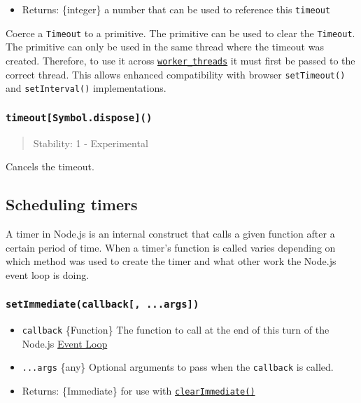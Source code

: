 \begin{itemize}
\tightlist
\item
  Returns: \{integer\} a number that can be used to reference this
  \texttt{timeout}
\end{itemize}

Coerce a \texttt{Timeout} to a primitive. The primitive can be used to
clear the \texttt{Timeout}. The primitive can only be used in the same
thread where the timeout was created. Therefore, to use it across
\href{worker_threads.md}{\texttt{worker\_threads}} it must first be
passed to the correct thread. This allows enhanced compatibility with
browser \texttt{setTimeout()} and \texttt{setInterval()}
implementations.

\subsubsection{\texorpdfstring{\texttt{timeout{[}Symbol.dispose{]}()}}{timeout{[}Symbol.dispose{]}()}}\label{timeoutsymbol.dispose}

\begin{quote}
Stability: 1 - Experimental
\end{quote}

Cancels the timeout.

\subsection{Scheduling timers}\label{scheduling-timers}

A timer in Node.js is an internal construct that calls a given function
after a certain period of time. When a timer's function is called varies
depending on which method was used to create the timer and what other
work the Node.js event loop is doing.

\subsubsection{\texorpdfstring{\texttt{setImmediate(callback{[},\ ...args{]})}}{setImmediate(callback{[}, ...args{]})}}\label{setimmediatecallback-...args}

\begin{itemize}
\tightlist
\item
  \texttt{callback} \{Function\} The function to call at the end of this
  turn of the Node.js
  \href{https://nodejs.org/en/docs/guides/event-loop-timers-and-nexttick/\#setimmediate-vs-settimeout}{Event
  Loop}
\item
  \texttt{...args} \{any\} Optional arguments to pass when the
  \texttt{callback} is called.
\item
  Returns: \{Immediate\} for use with
  \hyperref[clearimmediateimmediate]{\texttt{clearImmediate()}}
\end{itemize}

